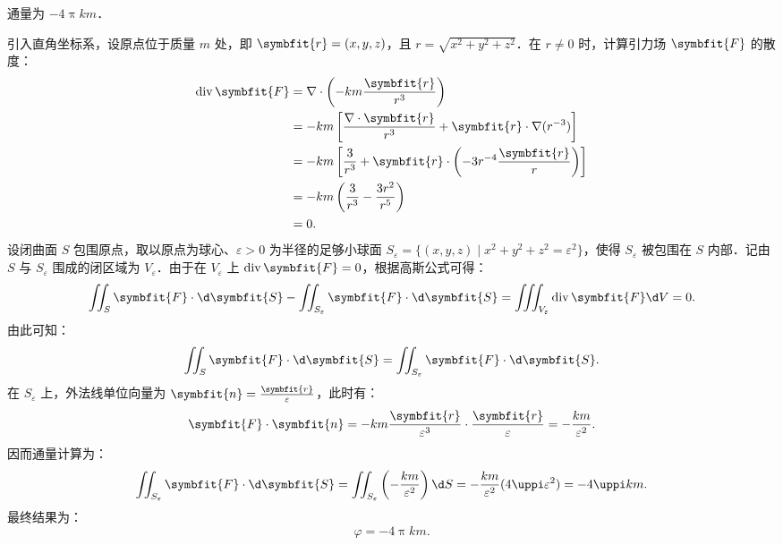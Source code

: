 \begin{solution}
     通量为 $-4\uppi km$．

    引入直角坐标系，设原点位于质量 $m$ 处，即 $\symbfit{r} = (x, y, z)$，且 $r = \sqrt{x^2+y^2+z^2}$．在 $r \neq 0$ 时，计算引力场 $\symbfit{F}$ 的散度：
    \begin{equation}
        \label{eq:div-F-1}
        \begin{aligned}
            \operatorname{div} \symbfit{F} & = \nabla \cdot \left( -km \frac{\symbfit{r}}{r^3} \right)                                             \\
                                           & = -km \left[ \frac{\nabla \cdot \symbfit{r}}{r^3} + \symbfit{r} \cdot \nabla (r^{-3}) \right]         \\
                                           & = -km \left[ \frac{3}{r^3} + \symbfit{r} \cdot \left( -3 r^{-4} \frac{\symbfit{r}}{r} \right) \right] \\
                                           & = -km \left( \frac{3}{r^3} - \frac{3 r^2}{r^5} \right)                                                \\
                                           & = 0.
        \end{aligned}
    \end{equation}
    设闭曲面 $S$ 包围原点，取以原点为球心、$\varepsilon > 0$ 为半径的足够小球面 $S_\varepsilon = \{ (x, y, z) \mid x^2 + y^2 + z^2 = \varepsilon^2 \}$，使得 $S_\varepsilon$ 被包围在 $S$ 内部．记由 $S$ 与 $S_\varepsilon$ 围成的闭区域为 $V_\varepsilon$．由于在 $V_\varepsilon$ 上 $\operatorname{div} \symbfit{F} = 0$，根据高斯公式可得：
    \begin{equation}
        \label{eq:gauss-1-1}
        \iint_{S} \symbfit{F} \cdot \d \symbfit{S} - \iint_{S_\varepsilon} \symbfit{F} \cdot \d \symbfit{S} = \iiint_{V_\varepsilon} \operatorname{div} \symbfit{F} \d V = 0.
    \end{equation}
    由此可知：
    \begin{equation}
        \label{eq:relation-1}
        \iint_{S} \symbfit{F} \cdot \d \symbfit{S} = \iint_{S_\varepsilon} \symbfit{F} \cdot \d \symbfit{S}.
    \end{equation}
    在 $S_\varepsilon$ 上，外法线单位向量为 $\symbfit{n} = \frac{\symbfit{r}}{\varepsilon}$，此时有：
    \begin{equation}
        \label{eq:integrand-1}
        \symbfit{F} \cdot \symbfit{n} = -km \frac{\symbfit{r}}{\varepsilon^3} \cdot \frac{\symbfit{r}}{\varepsilon} = -\frac{km}{\varepsilon^2}.
    \end{equation}
    因而通量计算为：
    \begin{equation}
        \label{eq:flux-calc-1}
        \iint_{S_\varepsilon} \symbfit{F} \cdot \d \symbfit{S} = \iint_{S_\varepsilon} \left( -\frac{km}{\varepsilon^2} \right) \d S = -\frac{km}{\varepsilon^2} (4\uppi \varepsilon^2) = -4\uppi km.
    \end{equation}
    最终结果为：
    \begin{equation}
        \label{eq:final-ans-1}
        \varphi = \boxed{-4\uppi km}.
    \end{equation}


\end{solution}
